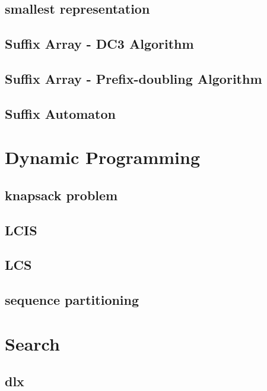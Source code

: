 \documentclass[a4paper,5pt,twocolumn,titlepage]{article}
\begin{document}
\subsection{smallest representation}

\subsection{Suffix Array - DC3 Algorithm}

\subsection{Suffix Array - Prefix-doubling Algorithm}

\subsection{Suffix Automaton}


\section{Dynamic Programming}
\subsection{knapsack problem}

\subsection{LCIS}

\subsection{LCS}

\subsection{sequence partitioning}


\section{Search}
\subsection{dlx}

\end{document}
